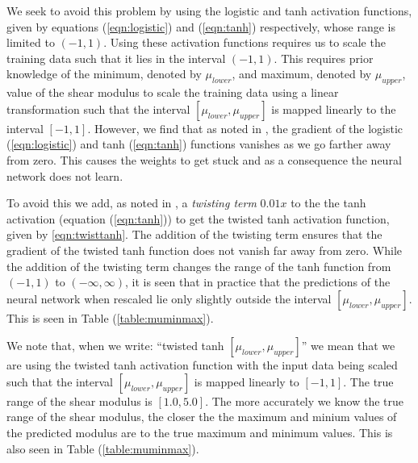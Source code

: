 \documentclass[12pt]{article}
\begin{document}
We seek to avoid this problem by using the logistic and tanh activation functions, given by equations (\ref{eqn:logistic}) and (\ref{eqn:tanh}) respectively, whose range is limited to $(-1,1)$. Using these activation functions requires us to scale the training data such that it lies in the interval $(-1,1)$. This requires prior knowledge of the minimum, denoted by $\mu_{lower}$, and maximum, denoted by $\mu_{upper}$, value of the shear modulus to scale the training data using a linear transformation such that the interval $[\mu_{lower},\mu_{upper}]$ is mapped linearly to the interval $[-1,1]$. However, we find that as noted in \cite{bookchap:lecun98b}, the gradient of the logistic (\ref{eqn:logistic}) and tanh (\ref{eqn:tanh}) functions vanishes as we go farther away from zero. This causes the weights to get stuck and as a consequence the neural network does not learn.

To avoid this we add, as noted in \cite{bookchap:lecun98b}, a \textit{twisting term} $0.01x$ to the the tanh activation (equation (\ref{eqn:tanh})) to get the twisted tanh activation function, given by \ref{eqn:twisttanh}. The addition of the twisting term ensures that the gradient of the twisted tanh function does not vanish far away from zero. While the addition of the twisting term changes the range of the tanh function from $(-1,1)$ to $(-\infty,\infty)$, it is seen that in practice that the predictions of the neural network when rescaled lie only slightly outside the interval $[\mu_{lower},\mu_{upper}]$. This is seen in Table (\ref{table:muminmax}).

We note that, when we write: ``twisted tanh $[\mu_{lower},\mu_{upper}]$'' we mean that we are using the twisted tanh activation function with the input data being scaled such that the interval $[\mu_{lower},\mu_{upper}]$ is mapped linearly to $[-1,1]$. The true range of the shear modulus is $[1.0,5.0]$. The more accurately we know the true range of the shear modulus, the closer the the maximum and minium values of the predicted modulus are to the true maximum and minimum values. This is also seen in Table (\ref{table:muminmax}).
\end{document}
